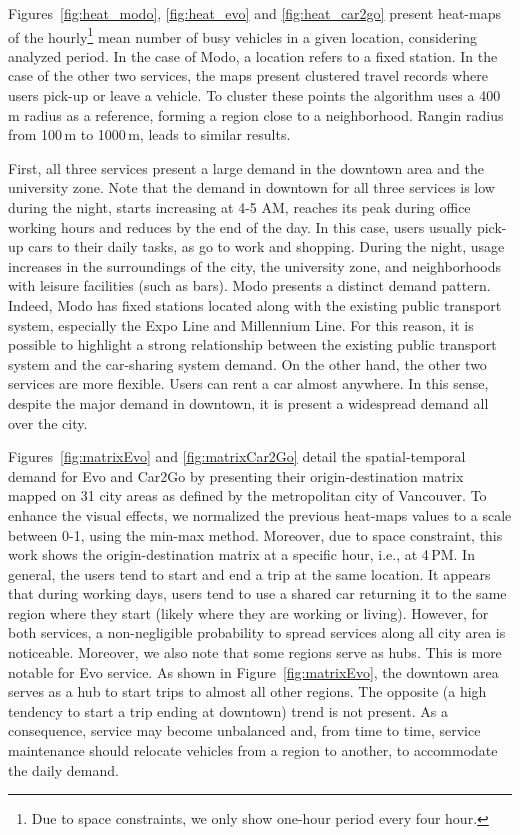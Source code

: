 Figures~\ref{fig:heat_modo}, \ref{fig:heat_evo} and \ref{fig:heat_car2go} present heat-maps of the hourly\footnote{Due to space constraints, we only show one-hour period every four hour.} mean number of busy vehicles in a given location, considering analyzed period. In the case of Modo, a location refers to a fixed station. In the case of the other two services, the maps present clustered travel records where users pick-up or leave a vehicle. To cluster these points the algorithm uses a 400\,m radius as a reference, forming a region close to a neighborhood. Rangin radius from 100\,m to 1000\,m, leads to similar results. 

First, all three services present a large demand in the downtown area and the university zone. Note that the demand in downtown for all three services is low during the night, starts increasing at 4-5 AM, reaches its peak during office working hours and reduces by the end of the day. In this case, users usually pick-up cars to their daily tasks, as go to work and shopping. During the night, usage increases in the surroundings of the city, the university zone, and neighborhoods with leisure facilities (such as bars). 
Modo presents a distinct demand pattern. Indeed, Modo has fixed stations located along with the existing public transport system, especially the Expo Line and Millennium Line. For this reason, it is possible to highlight a strong relationship between the existing public transport system and the car-sharing system demand. On the other hand, the other two services are more flexible. Users can rent a car almost anywhere. In this sense, despite the major demand in downtown, it is present a widespread demand all over the city.

Figures~\ref{fig:matrixEvo} and \ref{fig:matrixCar2Go} detail the spatial-temporal demand for Evo and Car2Go by presenting their origin-destination matrix mapped on 31 city areas as defined by the metropolitan city of Vancouver. To enhance the visual effects, we normalized the previous heat-maps values to a scale between 0-1, using the min-max method. Moreover, due to space constraint, this work shows the origin-destination matrix at a specific hour, i.e., at 4\,PM.
In general, the users tend to start and end a trip at the same location. It appears that during working days, users tend to use a shared car  returning it to the same region where they start (likely where they are working or living). However, for both services, a non-negligible probability to spread services along all city area is noticeable. 
Moreover, we also note that some regions serve as hubs. This is more notable for Evo service. As shown in Figure~\ref{fig:matrixEvo}, the downtown area serves as a hub to start trips to almost all other regions. The opposite (a high tendency to start a trip ending at downtown) trend is not present. As a consequence, service may become unbalanced and, from time to time, service maintenance should relocate vehicles from a region to another, to accommodate the daily demand.

